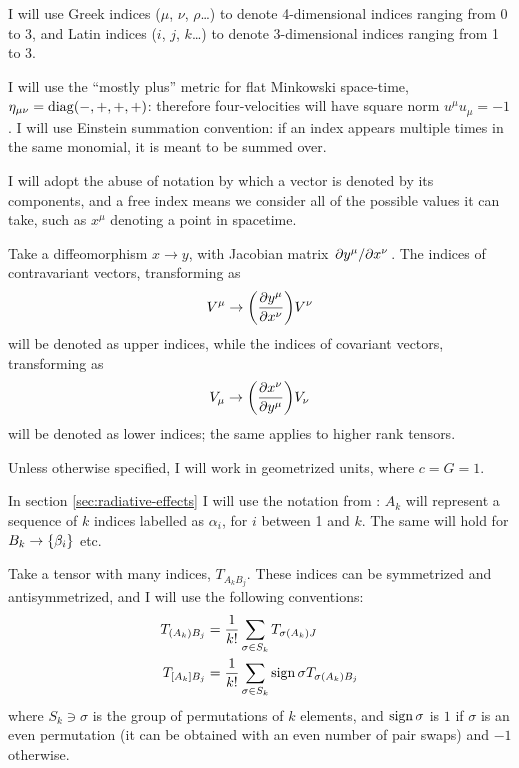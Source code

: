 \documentclass[main.tex]{subfiles}
\begin{document}
I will use Greek indices ($\mu$, $\nu$, $\rho$\dots) to denote 4-dimensional indices ranging from 0 to 3, and Latin indices ($i$, $j$, $k$\dots) to denote 3-dimensional indices ranging from 1 to 3.

I will use the ``mostly plus'' metric for flat Minkowski space-time, $\eta_{\mu \nu} = \operatorname{diag}(-, +, +, +)$: therefore four-velocities will have square norm \(u^\mu u_\mu = -1\).
I will use Einstein summation convention: if an index appears multiple times in the same monomial, it is meant to be summed over.

I will adopt the abuse of notation by which a vector is denoted by its components, and a free index means we consider all of the possible values it can take, such as \(x^\mu\) denoting a point in spacetime.

Take a diffeomorphism $x \rightarrow y$, with Jacobian matrix $\pdv*{y^\mu}{x^\nu}$.
The indices of contravariant vectors, transforming as
\begin{equation}
    V^\mu \rightarrow \qty( \pdv{y^\mu}{x^\nu})  V^\nu
\end{equation}
will be denoted as upper indices, while the indices of covariant vectors, transforming as
\begin{equation}
V_\mu \rightarrow \qty( \pdv{x^\nu}{y^\mu})  V_\nu
\end{equation}
will be denoted as lower indices; the same applies to higher rank tensors.

Unless otherwise specified, I will work in geometrized units, where $c = G = 1$.

In section \ref{sec:radiative-effects} I will use the notation from \textcite[]{Thorne:1981feb}: \(A_k\) will represent a sequence of \(k\) indices labelled as \(\alpha_i\), for \(i\) between 1 and \(k\). The same will hold for \(B_k \rightarrow \qty{\beta_i}\) etc.

Take a tensor with many indices, \(T_{A_k B_j}\). These indices can be symmetrized and antisymmetrized, and I will use the following conventions:
\begin{align}
    T_{(A_k) B_j } &= \frac{1}{k!} \sum_{\sigma \in S_k} T_{\sigma(A_k)J} \\
    T_{[A_k]B_j} &= \frac{1}{k!} \sum_{\sigma \in S_k} \sign{\sigma} T_{\sigma(A_k)B_j}
\end{align}
where \(S_k \ni \sigma \) is the group of permutations of $k$ elements, and $\operatorname{sign}{\sigma}$ is $1$ if $\sigma$ is an even permutation (it can be obtained with an even number of pair swaps) and $-1$ otherwise.

%
\end{document}
